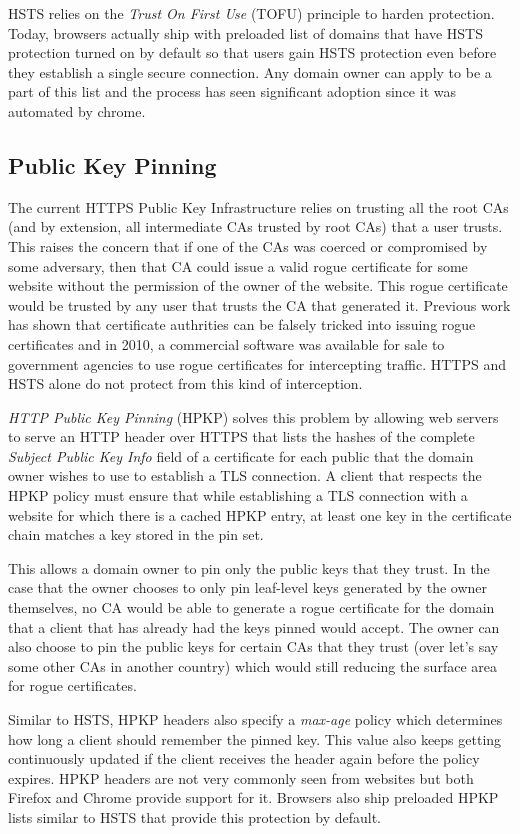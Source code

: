 HSTS relies on the \emph{Trust On First Use} (TOFU) principle to harden
protection. Today, browsers actually ship with preloaded list of domains that
have HSTS protection turned on by default so that users gain HSTS protection
even before they establish a single secure connection. Any domain owner can
apply to be a part of this list and the process has seen significant adoption
since it was automated by chrome.


\subsection{Public Key Pinning}
The current HTTPS Public Key Infrastructure relies on trusting all the root CAs
(and by extension, all intermediate CAs trusted by root CAs) that a user
trusts. This raises the concern that if one of the CAs was coerced or
compromised by some adversary, then that CA could issue a valid rogue
certificate for some website without the permission of the owner of the
website. This rogue certificate would be trusted by any user that trusts the CA
that generated it. Previous work has shown that certificate authrities can be
falsely tricked into issuing rogue certificates and in 2010, a commercial
software was available for sale to government agencies to use rogue
certificates for intercepting traffic. HTTPS and HSTS alone do not protect from
this kind of interception.

\emph{HTTP Public Key Pinning} (HPKP) solves this problem by allowing web
servers to serve an HTTP header over HTTPS that lists the hashes of the
complete \emph{Subject Public Key Info} field of a certificate for each public
that the domain owner wishes to use to establish a TLS connection. A client
that respects the HPKP policy must ensure that while establishing a TLS
connection with a website for which there is a cached HPKP entry, at least one
key in the certificate chain matches a key stored in the pin set.

This allows a domain owner to pin only the public keys that they trust. In the
case that the owner chooses to only pin leaf-level keys generated by the owner
themselves, no CA would be able to generate a rogue certificate for the domain
that a client that has already had the keys pinned would accept. The owner can
also choose to pin the public keys for certain CAs that they trust (over let's
say some other CAs in another country) which would still reducing the surface
area for rogue certificates.

Similar to HSTS, HPKP headers also specify a \emph{max-age} policy which
determines how long a client should remember the pinned key. This value also
keeps getting continuously updated if the client receives the header again
before the policy expires. HPKP headers are not very commonly seen from
websites but both Firefox and Chrome provide support for it. Browsers also
ship preloaded HPKP lists similar to HSTS that provide this protection
by default.

